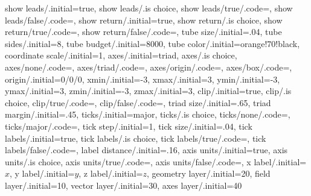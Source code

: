 { show leads/.initial={true},
 show leads/.is choice,
 show leads/true/.code={},
 show leads/false/.code={},
 show return/.initial={true},
 show return/.is choice,
 show return/true/.code={},
 show return/false/.code={},
 tube size/.initial={.04},
 tube sides/.initial={8},
 tube budget/.initial={8000},
 tube color/.initial={orange!70!black},
 coordinate scale/.initial={1},
 axes/.initial={triad},
 axes/.is choice,
 axes/none/.code={},
 axes/triad/.code={},
 axes/origin/.code={},
 axes/box/.code={},
 origin/.initial={0/0/0},
 xmin/.initial={-3},
 xmax/.initial={3},
 ymin/.initial={-3},
 ymax/.initial={3},
 zmin/.initial={-3},
 zmax/.initial={3},
 clip/.initial={true},
 clip/.is choice,
 clip/true/.code={},
 clip/false/.code={},
 triad size/.initial={.65},
 triad margin/.initial={.45},
 ticks/.initial={major},
 ticks/.is choice,
 ticks/none/.code={},
 ticks/major/.code={},
 tick step/.initial={1},
 tick size/.initial={.04},
 tick labels/.initial={true},
 tick labels/.is choice,
 tick labels/true/.code={},
 tick labels/false/.code={},
 label distance/.initial={.16},
 axis units/.initial={true},
 axis units/.is choice,
 axis units/true/.code={},
 axis units/false/.code={},
 x label/.initial={$x$},
 y label/.initial={$y$},
 z label/.initial={$z$},
 geometry layer/.initial={20},
 field layer/.initial={10},
 vector layer/.initial={30},
 axes layer/.initial={40}}
